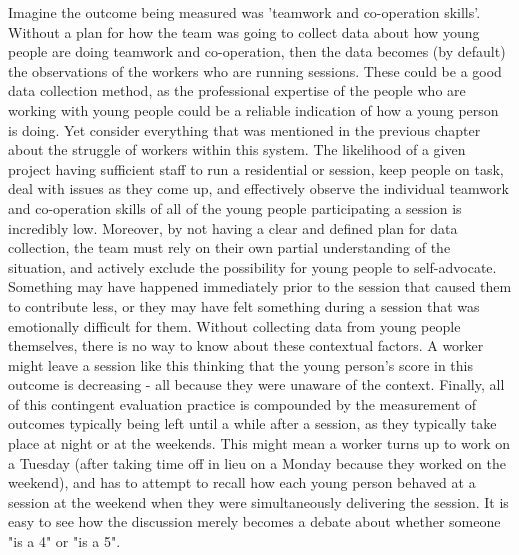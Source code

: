 Imagine the outcome being measured was 'teamwork and co-operation skills'. Without a plan for how the team was going to collect data about how young people are doing teamwork and co-operation, then the data becomes (by default) the observations of the workers who are running sessions. These could be a good data collection method, as the professional expertise of the people who are working with young people could be a reliable indication of how a young person is doing. Yet consider everything that was mentioned in the previous chapter about the struggle of workers within this system. The likelihood of a given project having sufficient staff to run a residential or session, keep people on task, deal with issues as they come up, and effectively observe the individual teamwork and co-operation skills of all of the young people participating a session is incredibly low. Moreover, by not having a clear and defined plan for data collection, the team must rely on their own partial understanding of the situation, and actively exclude the possibility for young people to self-advocate. Something may have happened immediately prior to the session that caused them to contribute less, or they may have felt something during a session that was emotionally difficult for them. Without collecting data from young people themselves, there is no way to know about these contextual factors. A worker might leave a session like this thinking that the young person's score in this outcome is decreasing - all because they were unaware of the context. Finally, all of this contingent evaluation practice is compounded by the measurement of outcomes typically being left until a while after a session, as they typically take place at night or at the weekends. This might mean a worker turns up to work on a Tuesday (after taking time off in lieu on a Monday because they worked on the weekend), and has to attempt to recall how each young person behaved at a session at the weekend when they were simultaneously delivering the session. It is easy to see how the discussion merely becomes a debate about whether someone "is a 4" or "is a 5". 


